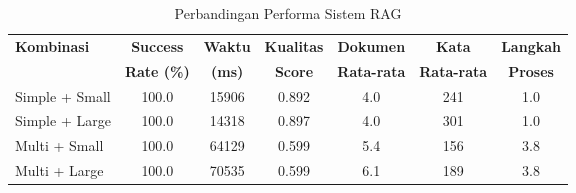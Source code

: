 
\begin{table}[h]
\centering
\caption{Perbandingan Performa Sistem RAG}
\label{tab:rag_comparison}
\begin{tabular}{|l|c|c|c|c|c|c|}
\hline
\textbf{Kombinasi} & \textbf{Success} & \textbf{Waktu} & \textbf{Kualitas} & \textbf{Dokumen} & \textbf{Kata} & \textbf{Langkah} \\
\textbf{} & \textbf{Rate (\%)} & \textbf{(ms)} & \textbf{Score} & \textbf{Rata-rata} & \textbf{Rata-rata} & \textbf{Proses} \\
\hline
Simple + Small & 100.0 & 15906 & 0.892 & 4.0 & 241 & 1.0 \\
Simple + Large & 100.0 & 14318 & 0.897 & 4.0 & 301 & 1.0 \\
Multi + Small & 100.0 & 64129 & 0.599 & 5.4 & 156 & 3.8 \\
Multi + Large & 100.0 & 70535 & 0.599 & 6.1 & 189 & 3.8 \\
\hline
\end{tabular}
\end{table}
